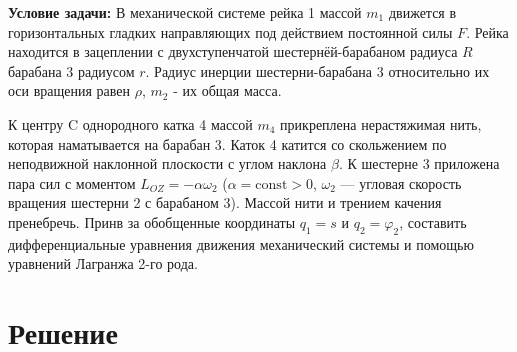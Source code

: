 \documentclass{article}
\begin{document}
\begin{minipage}{0.1\textwidth}
\end{minipage}
\hfill
\begin{minipage}{0.45\textwidth}
\par
\vspace{5pt}
\textbf{Условие задачи:}
В механической системе рейка 1 массой $m_1$ движется в горизонтальных гладких направляющих под действием постоянной силы $F$. Рейка находится в зацеплении с двухступенчатой шестернёй-барабаном радиуса $R$ барабана 3 радиусом $r$. Радиус инерции шестерни-барабана 3 относительно их оси вращения равен $\rho$, $m_2$ - их общая масса.
\end{minipage}
\par
\vspace{5pt}
\noindent
	К центру C однородного катка 4 массой $m_4$ прикреплена нерастяжимая нить, которая наматывается на барабан 3. Каток 4 катится со скольжением по неподвижной наклонной плоскости с углом наклона $\beta$. К шестерне 3 приложена пара сил с моментом $L_{OZ} = -\alpha \omega_2$ ($\alpha = \text{const} > 0$, $\omega_2$ --- угловая скорость вращения шестерни 2 с барабаном 3). Массой нити и трением качения пренебречь. Принв за обобщенные координаты $q_1 = s$ и $q_2 = \varphi_2$, составить дифференциальные уравнения движения механический системы и помощью уравнений Лагранжа 2-го рода.
\section*{Решение}
\end{document}
